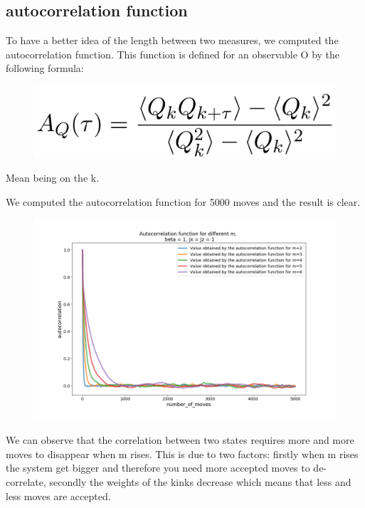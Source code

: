 \documentclass[a4paper,12pt,twoside]{article}
\begin{document}
	 
	 \subsection{autocorrelation function}
	 To have a better idea of the length between two measures, we computed the autocorrelation function. This function is defined for an observable O by the following formula:
	\begin{figure}[!h]
			 	\centering
			 	
			 	\includegraphics[scale=0.25]{autocorformula.png}
		
	\end{figure}
		
	Mean being on the k.
	
	We computed the autocorrelation function for 5000 moves and the result is clear.
	\begin{figure}[!h]
		\centering
		
		\includegraphics[scale=0.4]{autocorrelation_functionx=z=1_m2-6.png}
		
		
	\end{figure}

	We can observe that the correlation between two states requires more and more moves to disappear when m rises. This is due to two factors: firstly when m rises the system get bigger and therefore you need more accepted moves to de-correlate, secondly the weights of the kinks  decrease which means that less and less moves are accepted.
\end{document}
